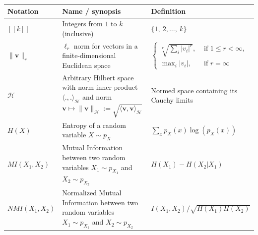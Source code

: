 \documentclass[nobib, a4paper, notoc, twoside, justified, openany]{tufte-book}
\providecommand{\B}[1]{\mathbf{#1}}
\def\v{\mathbf{v}}
\begin{document}
\begin{fullwidth}
\def\arraystretch{1.5}
\begin{longtable}{p{2cm} | p{6cm} | p{9cm}}
\cmidrule{1-3}
Notation & Name / synopsis & Definition\\ 
  \midrule
  $[\![k]\!]$ & Integers from $1$ to $k$ (inclusive) & $\{1,~2, \ldots,~k \}$ \\
  $\| \B{v} \|_r$ & $\ell_r$ norm for vectors in  a finite-dimensional Euclidean space & $\begin{cases}\sqrt[r]{\sum_i |v_i|^r},&\mbox{ if }1 \le r < \infty,\\\max_{i}|v_i|,&\mbox { if }r = \infty\end{cases}$ \\
  $\mathcal H$ & Arbitrary Hilbert space with norm inner product $\langle .,.\rangle_{\mathcal H}$ and norm $\v \mapsto \|\v\|_{\mathcal H} := \sqrt{\langle \v,\v\rangle_{\mathcal H}}$& Normed space containing its Cauchy limits\\
$H(X)$ & Entropy of a random variable $X \sim p_X$ & $\sum_{x}p_{X}(x)\log(p_{X}(x))$\\
$MI(X_1,X_2)$ & Mutual Information between two random variables $X_1 \sim p_{X_1}$ and $X_2 \sim p_{X_2}$ & 
$ H(X_1) - H(X_2|X_1)$\\

 $NMI(X_1,X_2)$ & Normalized Mutual Information between two random variables $X_1 \sim p_{X_1}$ and $X_2 \sim p_{X_2}$ & $I(X_1,X_2)/\sqrt{H(X_1)H(X_2)}$ \\


\end{longtable}
\end{fullwidth}
\end{document}
